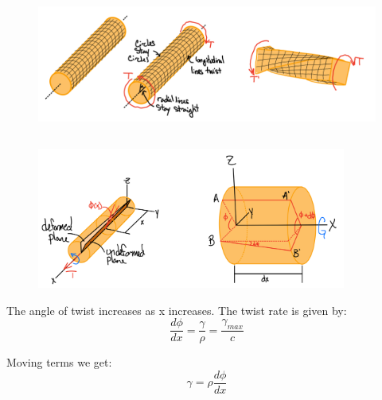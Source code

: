 \begin{figure}[!h]
\centering
\includegraphics[angle=0, width=6in]{Torsion-Figures/TorsionLines.png}
\vspace{-2mm}
\caption{\small {}}
\vspace{-3mm}
\label{Fig:Lines}
\end{figure}

\subsection{}

\subsubsection{}

\begin{figure}[!h]
\centering
\includegraphics[angle=0, width=4in]{Torsion-Figures/GeometryDeformation.png}
\vspace{-2mm}
\caption{\small {}}
\vspace{-3mm}
\label{Fig:Lines}
\end{figure}

\noindent The angle of twist increases as x increases. The twist rate is given by: \[\frac{d\phi}{dx} = \frac{\gamma}{\rho} = \frac{\gamma_{max}}{c}\]

\noindent Moving terms we get:\[\gamma = \rho \frac{d\phi}{dx}\]


